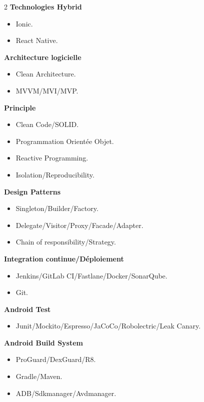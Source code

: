 \documentclass[10pt,a4paper,withhyper]{altacv}
\begin{document}
\begin{paracol}{2}
\textbf{Technologies Hybrid }

\begin{itemize}
	\item Ionic.
	\item React Native.
\end{itemize}
\divider

\textbf{Architecture logicielle}

\begin{itemize}
	\item Clean Architecture.
	\item MVVM/MVI/MVP.
\end{itemize}
\divider

\textbf{Principle}

\begin{itemize}
	\item Clean Code/SOLID.
	\item Programmation Orientée Objet.
	\item Reactive Programming.
	\item Isolation/Reproducibility.
\end{itemize}
\divider

\textbf{Design Patterns}

\begin{itemize}
	\item Singleton/Builder/Factory.
	\item Delegate/Visitor/Proxy/Facade/Adapter.
	\item Chain of responsibility/Strategy.
\end{itemize}
\divider

\textbf{Integration continue/Déploiement}

\begin{itemize}
	\item Jenkins/GitLab CI/Fastlane/Docker/SonarQube.
	\item Git.
\end{itemize}
\divider

\textbf{Android Test}

\begin{itemize}
	\item Junit/Mockito/Espresso/JaCoCo/Robolectric/Leak Canary.
\end{itemize}
\divider

\textbf{Android Build System}

\begin{itemize}
	\item ProGuard/DexGuard/R8.
	\item Gradle/Maven.
	\item ADB/Sdkmanager/Avdmanager.
\end{itemize}
\divider


\end{paracol}
\end{document}
